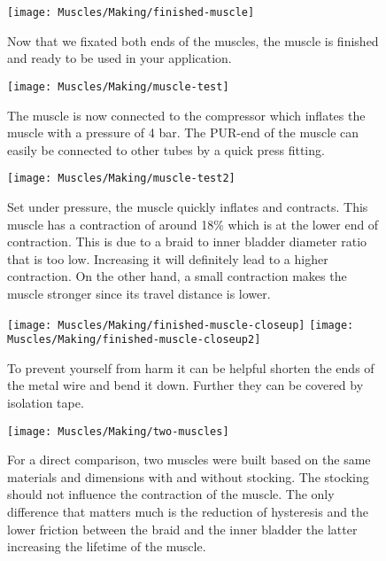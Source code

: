\documentclass[main]{subfiles}
\begin{document}
\begin{figure}[H]
\centering
\texttt{[image: Muscles/Making/finished-muscle]}
\caption[Finished muscle]{Now that we fixated both ends of the muscles, the muscle is finished and ready to be used in your application.}
\label{finished-muscle}
\end{figure}

\begin{figure}[H]
\centering
\texttt{[image: Muscles/Making/muscle-test]}
\caption[Inflating the muscle]{The muscle is now connected to the compressor which inflates the muscle with a pressure of 4 bar. The PUR-end of the muscle can easily be connected to other tubes by a quick press fitting.}
\label{muscle-test}
\end{figure}

\begin{figure}[H]
\centering
\texttt{[image: Muscles/Making/muscle-test2]}
\caption[Inflated muscle]{Set under pressure, the muscle quickly inflates and contracts. This muscle has a contraction of around 18\% which is at the lower end of contraction. This is due to a braid to inner bladder diameter ratio that is too low. Increasing it will definitely lead to a higher contraction. On the other hand, a small contraction makes the muscle stronger since its travel distance is lower.}
\label{braided-sleeve2}
\end{figure}

\begin{figure}[H]
\centering
\texttt{[image: Muscles/Making/finished-muscle-closeup]}
\texttt{[image: Muscles/Making/finished-muscle-closeup2]}
\caption[Finished-muscle-closeup]{To prevent yourself from harm it can be helpful shorten the ends of the metal wire and bend it down. Further they can be covered by isolation tape.}
\label{finished-muscle-closeup}
\end{figure}

\begin{figure}[H]
\centering
\texttt{[image: Muscles/Making/two-muscles]}
\caption[Two muscles with and without stocking]{For a direct comparison, two muscles were built based on the same materials and dimensions with and without stocking. The stocking should not influence the contraction of the muscle. The only difference that matters much is the reduction of hysteresis and the lower friction between the braid and the inner bladder the latter increasing the lifetime of the muscle.}
\label{two-muscles}
\end{figure}
\end{document}
